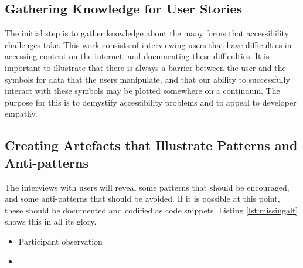 \subsection{Gathering Knowledge for User Stories} %
\label{sub:part_1_gathering_knowledge_for_user_stories}

The initial step is to gather knowledge about the many forms that accessibility challenges take. This work consists of interviewing users that have difficulties in accessing content on the internet, and documenting these difficulties. It is important to illustrate that there is always a barrier between the user and the symbols for data that the users manipulate, and that our ability to successfully interact with these symbols may be plotted somewhere on a continuum. The purpose for this is to demystify accessibility problems and to appeal to developer empathy.


\subsection{Creating Artefacts that Illustrate Patterns and Anti-patterns} %
\label{sub:part_2_creating_artefacts_that_illustrate_patterns_and_anti_patterns}

The interviews with users will reveal some patterns that should be encouraged, and some anti-patterns that should be avoided. If it is possible at this point, these should be documented and codified as code snippets. Listing \ref{lst:missingalt} shows this in all its glory.







\begin{itemize}
	\item Participant observation
	\item 
\end{itemize}




